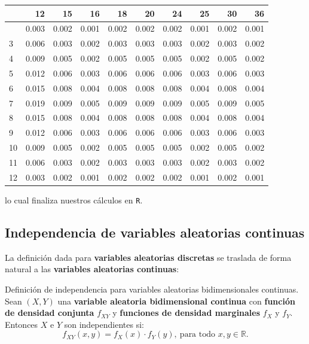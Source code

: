 \documentclass[
  letterpaper,
  DIV=11,
  numbers=noendperiod]{scrreprt}
\begin{document}
\begin{longtable}[]{@{}lrrrrrrrrr@{}}
\toprule\noalign{}
& 12 & 15 & 16 & 18 & 20 & 24 & 25 & 30 & 36 \\
\midrule\noalign{}
\endhead
\bottomrule\noalign{}
\endlastfoot
2 & 0.003 & 0.002 & 0.001 & 0.002 & 0.002 & 0.002 & 0.001 & 0.002 &
0.001 \\
3 & 0.006 & 0.003 & 0.002 & 0.003 & 0.003 & 0.003 & 0.002 & 0.003 &
0.002 \\
4 & 0.009 & 0.005 & 0.002 & 0.005 & 0.005 & 0.005 & 0.002 & 0.005 &
0.002 \\
5 & 0.012 & 0.006 & 0.003 & 0.006 & 0.006 & 0.006 & 0.003 & 0.006 &
0.003 \\
6 & 0.015 & 0.008 & 0.004 & 0.008 & 0.008 & 0.008 & 0.004 & 0.008 &
0.004 \\
7 & 0.019 & 0.009 & 0.005 & 0.009 & 0.009 & 0.009 & 0.005 & 0.009 &
0.005 \\
8 & 0.015 & 0.008 & 0.004 & 0.008 & 0.008 & 0.008 & 0.004 & 0.008 &
0.004 \\
9 & 0.012 & 0.006 & 0.003 & 0.006 & 0.006 & 0.006 & 0.003 & 0.006 &
0.003 \\
10 & 0.009 & 0.005 & 0.002 & 0.005 & 0.005 & 0.005 & 0.002 & 0.005 &
0.002 \\
11 & 0.006 & 0.003 & 0.002 & 0.003 & 0.003 & 0.003 & 0.002 & 0.003 &
0.002 \\
12 & 0.003 & 0.002 & 0.001 & 0.002 & 0.002 & 0.002 & 0.001 & 0.002 &
0.001 \\
\end{longtable}

lo cual finaliza nuestros cálculos en \texttt{R}.

\hypertarget{independencia-de-variables-aleatorias-continuas}{%
\subsection{Independencia de variables aleatorias
continuas}\label{independencia-de-variables-aleatorias-continuas}}

La definición dada para \textbf{variables aleatorias discretas} se
traslada de forma natural a las \textbf{variables aleatorias continuas}:

Definición de independencia para variables aleatorias bidimensionales
continuas. Sean \((X,Y)\) una \textbf{variable aleatoria bidimensional
continua} con \textbf{función de densidad conjunta} \(f_{XY}\) y
\textbf{funciones de densidad marginales} \(f_X\) y \(f_Y\). Entonces
\(X\) e \(Y\) son independientes si: \[
f_{XY}(x,y)=f_X(x)\cdot f_Y(y),\ \mbox{para todo $x,y\in\mathbb{R}$.}
\]
\end{document}
